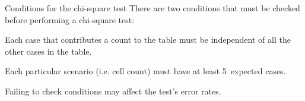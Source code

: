 \begin{onebox}{Conditions for the chi-square test}
  There are two conditions that must be checked before
  performing a chi-square test:\vspace{-1mm}
  \begin{description}
  \setlength{\itemsep}{0mm}
  \item[Independence.] Each case that contributes a count to
      the table must be independent of all the other cases in
      the table.
  \item[Sample size / distribution.] Each particular scenario
      (i.e. cell count) must have at least 5~expected cases.
  \end{description}
  Failing to check conditions may affect the test's error rates.
\end{onebox}


